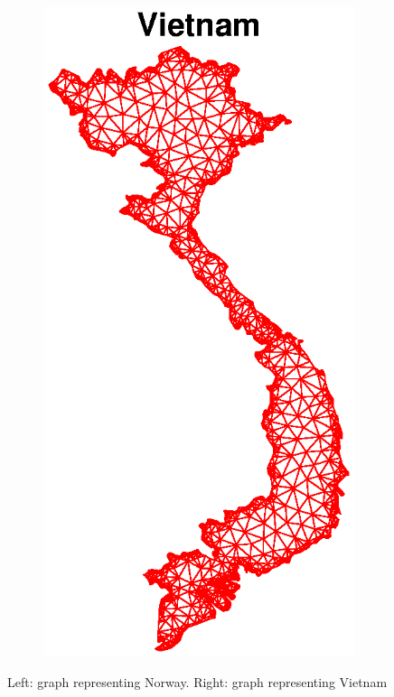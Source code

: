\documentclass[unicode,11pt,a4paper,oneside,numbers=endperiod,openany]{scrartcl}
\begin{document}
\begin{figure}[h!]
\begin{subfigure}[b]{0.48\textwidth}
	\includegraphics[width=\textwidth]{images/VietnamEx1.eps} 
	\end{subfigure}
	\caption{Left: graph representing Norway. Right: graph representing Vietnam}	
	\label{fig:novnEx1}
\end{figure}
\end{document}

